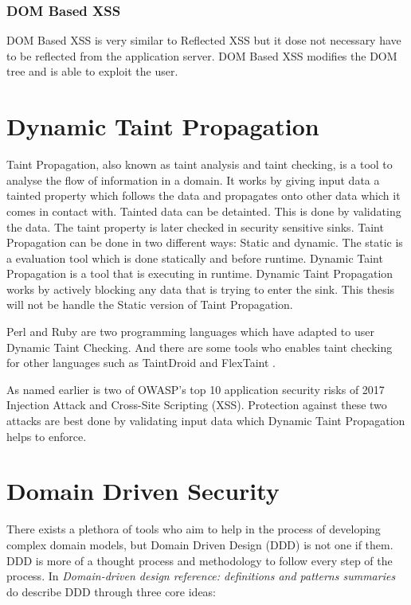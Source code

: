\subsubsection{DOM Based XSS}
DOM Based XSS is very similar to Reflected XSS but it dose not necessary have to be reflected from the application server. DOM Based XSS modifies the DOM tree and is able to exploit the user. \parencite{Secure_Web}


\section{Dynamic Taint Propagation}
Taint Propagation, also known as taint analysis and taint checking, is a tool to analyse the flow of information in a domain. \parencite{Pan2015} It works by giving input data a tainted property which follows the data and propagates onto other data which it comes in contact with. Tainted data can be detainted. This is done by validating the data. The taint property is later checked in security sensitive sinks. \parencite{Pan2015} Taint Propagation can be done in two different ways: Static and dynamic. The static is a evaluation tool which is done statically and before runtime. Dynamic Taint Propagation is a tool that is executing in runtime. Dynamic Taint Propagation works by actively blocking any data that is trying to enter the sink. This thesis will not be handle the Static version of Taint Propagation. 

Perl and Ruby are two programming languages which have adapted to user Dynamic Taint Checking. \parencite{perl, ruby} And there are some tools who enables taint checking for other languages such as TaintDroid \parencite{Ma2010} and FlexTaint \parencite{Venkataramani2008}.

As named earlier is two of OWASP's top 10 application security risks of 2017 Injection Attack and Cross-Site Scripting (XSS). \parencite{OWASP2017} Protection against these two attacks are best done by validating input data which Dynamic Taint Propagation helps to enforce.


\section{Domain Driven Security}
There exists a plethora of tools who aim to help in the process of developing complex domain models, but Domain Driven Design (DDD) is not one if them. \parencite{Bankes, 10.1007/978-3-319-24309-2_33} DDD is more of a thought process and methodology to follow every step of the process. \parencite{EvansEric2004Dd:t} In \emph{Domain-driven design reference: definitions and patterns summaries} do \textcite{evans_2015} describe DDD through three core ideas:

